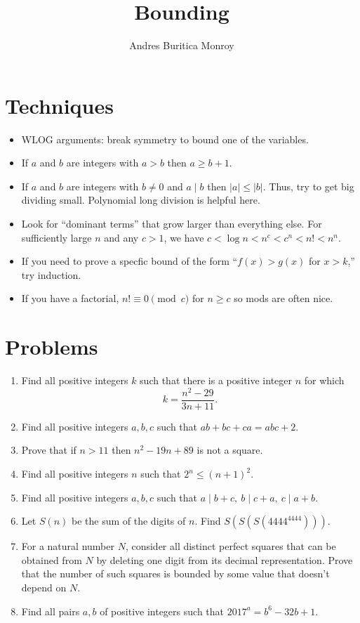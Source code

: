\documentclass{article}
\title{Bounding}
\author{Andres Buritica Monroy}
\date{}
\begin{document}
\maketitle
\section{Techniques}
\begin{itemize}
  \item WLOG arguments: break symmetry to bound one of the variables.
  \item If $a$ and $b$ are integers with $a>b$ then $a\ge b+1$.
  \item If $a$ and $b$ are integers with $b\ne 0$ and $a\mid b$ then
    $|a|\le|b|$. Thus, try to get big dividing small. Polynomial long division
    is helpful here.
  \item Look for ``dominant terms'' that grow larger than everything else. For
    sufficiently large $n$ and any $c>1$, we have $c<\log n<n^c<c^n<n!<n^n$.
  \item If you need to prove a specfic bound of the form ``$f(x)>g(x)$ for
    $x>k$,'' try induction.
  \item If you have a factorial, $n!\equiv 0\pmod c$ for $n\ge c$ so mods are
    often nice.
\end{itemize}
\section{Problems}
\begin{enumerate}
  \item Find all positive integers $k$ such that there is a positive integer $n$
    for which
    \[k=\frac{n^2-29}{3n+11}.\]
  \item Find all positive integers $a,b,c$ such that $ab+bc+ca=abc+2$.
  \item Prove that if $n>11$ then $n^2-19n+89$ is not a square.
  \item Find all positive integers $n$ such that $2^n\le (n+1)^2$.
  \item Find all positive integers $a,b,c$ such that $a\mid b+c,\ b\mid c+a,\
    c\mid a+b$.
  \item Let $S(n)$ be the sum of the digits of $n$. Find $S(S(S(4444^{4444})))$.
  \item  For a natural number $N$, consider all distinct perfect squares that
    can be obtained from $N$ by deleting one digit from its decimal
    representation. Prove that the number of such squares is bounded by some
    value that doesn't depend on $N$.
  \item Find all pairs $a,b$ of positive integers such that $2017^a=b^6-32b+1$.
\end{enumerate}
\newpage
\end{document}
